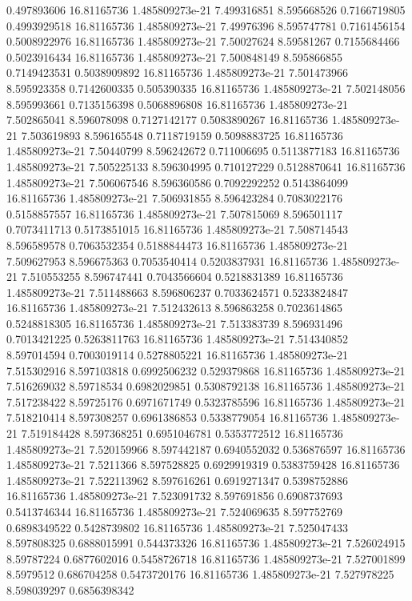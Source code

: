{0.497893606 16.81165736 1.485809273e-21 7.499316851 8.595668526 0.7166719805
0.4993929518 16.81165736 1.485809273e-21 7.49976396 8.595747781 0.7161456154
0.5008922976 16.81165736 1.485809273e-21 7.50027624 8.59581267 0.7155684466
0.5023916434 16.81165736 1.485809273e-21 7.500848149 8.595866855 0.7149423531
0.5038909892 16.81165736 1.485809273e-21 7.501473966 8.595923358 0.7142600335
0.505390335 16.81165736 1.485809273e-21 7.502148056 8.595993661 0.7135156398
0.5068896808 16.81165736 1.485809273e-21 7.502865041 8.596078098 0.7127142177
0.5083890267 16.81165736 1.485809273e-21 7.503619893 8.596165548 0.7118719159
0.5098883725 16.81165736 1.485809273e-21 7.50440799 8.596242672 0.711006695
0.5113877183 16.81165736 1.485809273e-21 7.505225133 8.596304995 0.710127229
0.5128870641 16.81165736 1.485809273e-21 7.506067546 8.596360586 0.7092292252
0.5143864099 16.81165736 1.485809273e-21 7.506931855 8.596423284 0.7083022176
0.5158857557 16.81165736 1.485809273e-21 7.507815069 8.596501117 0.7073411713
0.5173851015 16.81165736 1.485809273e-21 7.508714543 8.596589578 0.7063532354
0.5188844473 16.81165736 1.485809273e-21 7.509627953 8.596675363 0.7053540414
0.5203837931 16.81165736 1.485809273e-21 7.510553255 8.596747441 0.7043566604
0.5218831389 16.81165736 1.485809273e-21 7.511488663 8.596806237 0.7033624571
0.5233824847 16.81165736 1.485809273e-21 7.512432613 8.596863258 0.7023614865
0.5248818305 16.81165736 1.485809273e-21 7.513383739 8.596931496 0.7013421225
0.5263811763 16.81165736 1.485809273e-21 7.514340852 8.597014594 0.7003019114
0.5278805221 16.81165736 1.485809273e-21 7.515302916 8.597103818 0.6992506232
0.529379868 16.81165736 1.485809273e-21 7.516269032 8.59718534 0.6982029851
0.5308792138 16.81165736 1.485809273e-21 7.517238422 8.59725176 0.6971671749
0.5323785596 16.81165736 1.485809273e-21 7.518210414 8.597308257 0.6961386853
0.5338779054 16.81165736 1.485809273e-21 7.519184428 8.597368251 0.6951046781
0.5353772512 16.81165736 1.485809273e-21 7.520159966 8.597442187 0.6940552032
0.536876597 16.81165736 1.485809273e-21 7.5211366 8.597528825 0.6929919319
0.5383759428 16.81165736 1.485809273e-21 7.522113962 8.597616261 0.6919271347
0.5398752886 16.81165736 1.485809273e-21 7.523091732 8.597691856 0.6908737693
0.5413746344 16.81165736 1.485809273e-21 7.524069635 8.597752769 0.6898349522
0.5428739802 16.81165736 1.485809273e-21 7.525047433 8.597808325 0.6888015991
0.544373326 16.81165736 1.485809273e-21 7.526024915 8.59787224 0.6877602016
0.5458726718 16.81165736 1.485809273e-21 7.527001899 8.5979512 0.686704258
0.5473720176 16.81165736 1.485809273e-21 7.527978225 8.598039297 0.6856398342
}
